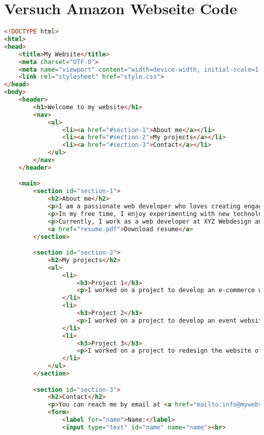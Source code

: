 \section{Versuch Amazon Webseite Code}

\begin{lstlisting}[language=HTML, caption=ChatGPT generierter HTML-Code amazon, label=Versuch-Amazon-Webseite]
<!DOCTYPE html>
<html>
<head>
	<title>My Website</title>
	<meta charset="UTF-8">
	<meta name="viewport" content="width=device-width, initial-scale=1.0">
	<link rel="stylesheet" href="style.css">
</head>
<body>
	<header>
		<h1>Welcome to my website</h1>
		<nav>
			<ul>
				<li><a href="#section-1">About me</a></li>
				<li><a href="#section-2">My projects</a></li>
				<li><a href="#section-3">Contact</a></li>
			</ul>
		</nav>
	</header>

	<main>
		<section id="section-1">
			<h2>About me</h2>
			<p>I am a passionate web developer who loves creating engaging websites. My focus is on developing responsive websites that look great on all devices and provide an excellent user experience.</p>
			<p>In my free time, I enjoy experimenting with new technologies and keeping up with the latest developments in web development.</p>
			<p>Currently, I work as a web developer at XYZ Webdesign and have worked on many exciting projects over the years. If you would like to learn more about my experience and skills, take a look at my resume.</p>
			<a href="resume.pdf">Download resume</a>
		</section>

		<section id="section-2">
			<h2>My projects</h2>
			<ul>
				<li>
					<h3>Project 1</h3>
					<p>I worked on a project to develop an e-commerce website for a client. The website was tailored to the client's needs and included features such as a product database, shopping cart, and order management.</p>
				</li>
				<li>
					<h3>Project 2</h3>
					<p>I worked on a project to develop an event website for a local organization. The website included information about upcoming events, a way to register online, and a discussion forum for participants.</p>
				</li>
				<li>
					<h3>Project 3</h3>
					<p>I worked on a project to redesign the website of a restaurant. The website included information about the menu, opening hours, and a way to make reservations online.</p>
				</li>
			</ul>
		</section>

		<section id="section-3">
			<h2>Contact</h2>
			<p>You can reach me by email at <a href="mailto:info@mywebsite.com">info@mywebsite.com</a> or by filling out the form below:</p>
			<form>
				<label for="name">Name:</label>
				<input type="text" id="name" name="name"><br>


\end{lstlisting}
